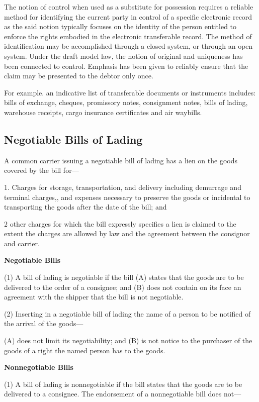 \documentclass{article}
\begin{document}
	The notion of control when used as a substitute for possession requires a reliable method for identifying the current party in control of a specific electronic record as the said notion typically focuses on the identity of the person entitled to enforce the rights embodied in the electronic transferable record. The method of identification may be accomplished through a closed system, or through an open system. Under the draft model law, the notion of original and uniqueness has been connected to control. Emphasis has been given to reliably ensure that the claim may be presented to the debtor only once. 

	For example. an indicative list of transferable documents or instruments includes: bills of exchange, cheques, promissory notes, consignment notes, bills of lading, warehouse receipts, cargo insurance certificates and air waybills.

\subsection{Negotiable Bills of Lading}
A common carrier issuing a negotiable bill of lading has a lien on the goods covered by the bill for—

1. Charges for storage, transportation, and delivery including demurrage and terminal charges,, and expenses necessary to preserve the goods or incidental to transporting the goods after the date of the bill; and

\(2\) other charges for which the bill expressly specifies a lien is claimed to the extent the charges are allowed by law and the agreement between the consignor and carrier.

\textbf{ Negotiable Bills}

(1) A bill of lading is negotiable if the bill
  (A) states that the goods are to be delivered to the order of a consignee; and
  (B) does not contain on its face an agreement with the shipper that the bill is not negotiable.

(2) Inserting in a negotiable bill of lading the name of a person to be notified of the arrival of the goods—

  (A) does not limit its negotiability; and
  (B) is not notice to the purchaser of the goods of a right the named person has to the goods.

 \textbf{Nonnegotiable Bills}

  (1) A bill of lading is nonnegotiable if the bill states that the goods are to be delivered to a consignee. The endorsement of a nonnegotiable bill does not—
\end{document}
